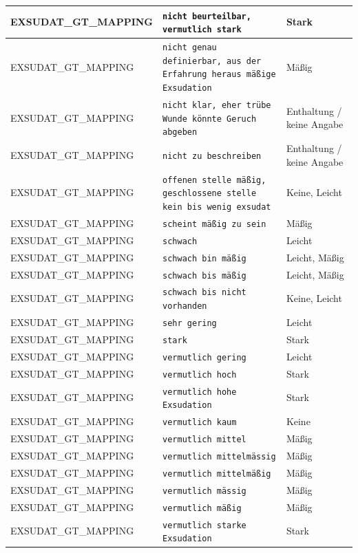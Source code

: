 \begin{longtable}{|p{3.5cm}|p{5cm}|p{6.5cm}|}
EXSUDAT\_GT\_MAPPING & \texttt{nicht beurteilbar, vermutlich stark} & Stark \\ \hline
EXSUDAT\_GT\_MAPPING & \texttt{nicht genau definierbar, aus der Erfahrung heraus mäßige Exsudation} & Mäßig \\ \hline
EXSUDAT\_GT\_MAPPING & \texttt{nicht klar, eher trübe Wunde könnte Geruch abgeben} & Enthaltung / keine Angabe \\ \hline
EXSUDAT\_GT\_MAPPING & \texttt{nicht zu beschreiben} & Enthaltung / keine Angabe \\ \hline
EXSUDAT\_GT\_MAPPING & \texttt{offenen stelle mäßig, geschlossene stelle kein bis wenig exsudat} & Keine, Leicht \\ \hline
EXSUDAT\_GT\_MAPPING & \texttt{scheint mäßig zu sein} & Mäßig \\ \hline
EXSUDAT\_GT\_MAPPING & \texttt{schwach} & Leicht \\ \hline
EXSUDAT\_GT\_MAPPING & \texttt{schwach bin mäßig} & Leicht, Mäßig \\ \hline
EXSUDAT\_GT\_MAPPING & \texttt{schwach bis mäßig} & Leicht, Mäßig \\ \hline
EXSUDAT\_GT\_MAPPING & \texttt{schwach bis nicht vorhanden} & Keine, Leicht \\ \hline
EXSUDAT\_GT\_MAPPING & \texttt{sehr gering} & Leicht \\ \hline
EXSUDAT\_GT\_MAPPING & \texttt{stark} & Stark \\ \hline
EXSUDAT\_GT\_MAPPING & \texttt{vermutlich gering} & Leicht \\ \hline
EXSUDAT\_GT\_MAPPING & \texttt{vermutlich hoch} & Stark \\ \hline
EXSUDAT\_GT\_MAPPING & \texttt{vermutlich hohe Exsudation} & Stark \\ \hline
EXSUDAT\_GT\_MAPPING & \texttt{vermutlich kaum} & Keine \\ \hline
EXSUDAT\_GT\_MAPPING & \texttt{vermutlich mittel} & Mäßig \\ \hline
EXSUDAT\_GT\_MAPPING & \texttt{vermutlich mittelmässig} & Mäßig \\ \hline
EXSUDAT\_GT\_MAPPING & \texttt{vermutlich mittelmäßig} & Mäßig \\ \hline
EXSUDAT\_GT\_MAPPING & \texttt{vermutlich mässig} & Mäßig \\ \hline
EXSUDAT\_GT\_MAPPING & \texttt{vermutlich mäßig} & Mäßig \\ \hline
EXSUDAT\_GT\_MAPPING & \texttt{vermutlich starke Exsudation} & Stark \\ \hline

\end{longtable}
